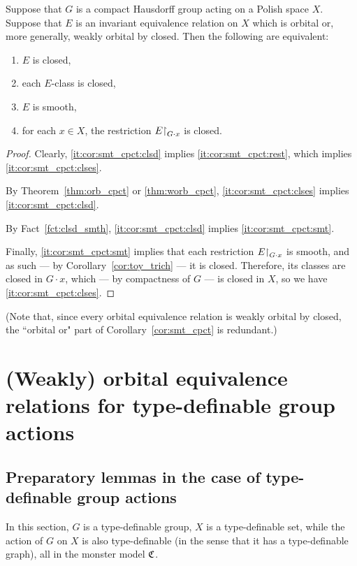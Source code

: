 	
	\begin{cor}
		\label{cor:smt_cpct}
		Suppose that $G$ is a compact Hausdorff group acting on a Polish space $X$. Suppose that $E$ is an invariant equivalence relation on $X$ which is orbital or, more generally, weakly orbital by closed.
		Then the following are equivalent:
		\begin{enumerate}
			\item
			\label{it:cor:smt_cpct:clsd}
			$E$ is closed,
			\item
			\label{it:cor:smt_cpct:clses}
			each $E$-class is closed,
			\item
			\label{it:cor:smt_cpct:smt}
			$E$ is smooth,
			\item
			\label{it:cor:smt_cpct:rest}
			for each $x\in X$, the restriction $E\mathord{\upharpoonright}_{G\cdot x}$ is closed.
		\end{enumerate}
	\end{cor}
	\begin{proof}
		Clearly, \ref{it:cor:smt_cpct:clsd} implies \ref{it:cor:smt_cpct:rest}, which implies \ref{it:cor:smt_cpct:clses}.
		
		By Theorem~\ref{thm:orb_cpct} or \ref{thm:worb_cpct}, \ref{it:cor:smt_cpct:clses} implies \ref{it:cor:smt_cpct:clsd}.
		
		By Fact~\ref{fct:clsd_smth}, \ref{it:cor:smt_cpct:clsd} implies \ref{it:cor:smt_cpct:smt}.
		
		Finally, \ref{it:cor:smt_cpct:smt} implies that each restriction $E\mathord{\upharpoonright}_{G\cdot x}$ is smooth, and as such --- by Corollary~\ref{cor:toy_trich} --- it is closed. Therefore, its classes are closed in $G\cdot x$, which --- by compactness of $G$ --- is closed in $X$, so we have \ref{it:cor:smt_cpct:clses}.
	\end{proof}
	
	(Note that, since every orbital equivalence relation is weakly orbital by closed, the ``orbital or" part of Corollary~\ref{cor:smt_cpct} is redundant.)
	
	
	
	
	\section[Type-definable group actions]{(Weakly) orbital equivalence relations for type-definable group actions%
		}
	\label{sec:def}
	
	\subsection*{Preparatory lemmas in the case of type-definable group actions}
	In this section, $G$ is a type-definable group, $X$ is a type-definable set, while the action of $G$ on $X$ is also type-definable (in the sense that it has a type-definable graph), all in the monster model ${\mathfrak C}$.
	
